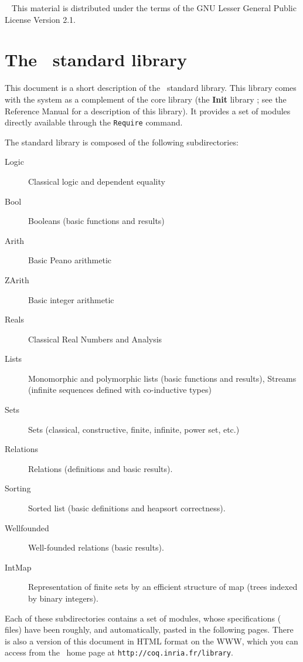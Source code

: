 \documentclass[11pt]{article}
\begin{document}
 
%
{\ }
{This material is distributed under the terms of the GNU Lesser
General Public License Version 2.1.}

\tableofcontents

\newpage
\section*{The \Coq\ standard library}

This document is a short description of the \Coq\ standard library.
This library comes with the system as a complement of the core library
(the {\bf Init} library ; see the Reference Manual for a description
of this library). It provides a set of modules directly available
through the \verb!Require! command.

The standard library is composed of the following subdirectories:
\begin{description}
  \item[Logic]  Classical logic and dependent equality
  \item[Bool]   Booleans (basic functions and results)
  \item[Arith]  Basic Peano arithmetic
  \item[ZArith] Basic integer arithmetic
  \item[Reals]  Classical Real Numbers and Analysis
  \item[Lists]  Monomorphic and polymorphic lists (basic functions and
                  results), Streams (infinite sequences defined 
                  with co-inductive types)
  \item[Sets]   Sets (classical, constructive, finite, infinite, power set,
                  etc.)
  \item[Relations] Relations (definitions and basic results).
  \item[Sorting] Sorted list (basic definitions and heapsort
                 correctness). 
  \item[Wellfounded] Well-founded relations (basic results).
  \item[IntMap]       Representation of finite sets by an efficient
                     structure of map (trees indexed by binary integers).
\end{description}


Each of these subdirectories contains a set of modules, whose
specifications (\gallina{} files) have
been roughly, and automatically, pasted in the following pages. There
is also a version of this document in HTML format on the WWW, which
you can access from the \Coq\ home page at
\texttt{http://coq.inria.fr/library}.


\end{document}
